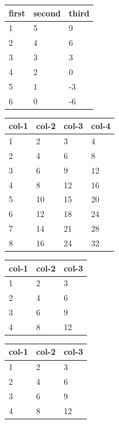 \documentclass[11pt,a4paper]{article}
\begin{document}
\begin{table}[h]
\begin{tabular}{|l|l|l|}
\hline
first  & second  & third \\ \hline
1 & 5 & 9 \\ \hline
2 & 4 & 6 \\ \hline
3 & 3 & 3 \\ \hline
4 & 2 & 0 \\ \hline
5 & 1 & -3 \\ \hline
6 & 0 & -6 \\ \hline
\end{tabular}
\end{table}

\begin{table}[h]
\begin{tabular}{|l|l|l|l|}
\hline
col-1 & col-2 & col-3 & col-4 \\ \hline
1 & 2 & 3 & 4 \\ \hline
2 & 4 & 6 & 8 \\ \hline
3 & 6 & 9 & 12 \\ \hline
4 & 8 & 12 & 16 \\ \hline
5 & 10 & 15 & 20 \\ \hline
6 & 12 & 18 & 24 \\ \hline
7 & 14 & 21 & 28 \\ \hline
8 & 16 & 24 & 32 \\ \hline
\end{tabular}
\end{table}

\begin{table}[h]
\begin{tabular}{|l|l|l|}
\hline
col-1 & col-2 & col-3 \\ \hline
1 & 2 & 3 \\ \hline
2 & 4 & 6 \\ \hline
3 & 6 & 9 \\ \hline
4 & 8 & 12 \\ \hline
\end{tabular}
\end{table}

\begin{table}[h]
\begin{tabular}{|l|l|l|}
\hline
col-1 & col-2 & col-3 \\ \hline
1 & 2 & 3 \\ \hline
2 & 4 & 6 \\ \hline
3 & 6 & 9 \\ \hline
4 & 8 & 12 \\ \hline
\end{tabular}
\end{table}
\end{document}
